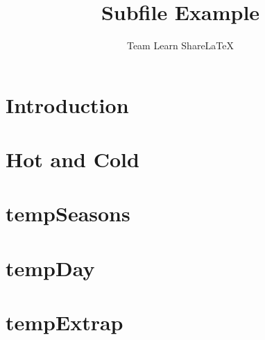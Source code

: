 \documentclass[a4paper,10pt]{article}
\title{Subfile Example}
\author{Team Learn ShareLaTeX}
\date{ }
\begin{document}
 
 
 
 
\section{Introduction}
 


\section{Hot and Cold}


\section{tempSeasons}


\section{tempDay}


\section{tempExtrap}




 
 
\end{document}
